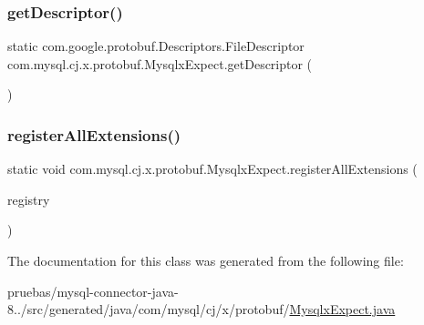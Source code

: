 \subsubsection{\texorpdfstring{get\+Descriptor()}{getDescriptor()}}
{\footnotesize\ttfamily static com.\+google.\+protobuf.\+Descriptors.\+File\+Descriptor com.\+mysql.\+cj.\+x.\+protobuf.\+Mysqlx\+Expect.\+get\+Descriptor (\begin{DoxyParamCaption}{ }\end{DoxyParamCaption})\hspace{0.3cm}{\ttfamily [static]}}

\mbox{\label{classcom_1_1mysql_1_1cj_1_1x_1_1protobuf_1_1_mysqlx_expect_ad11f0acd1644efca1f4e418da0d17e3c}} 
\subsubsection{\texorpdfstring{register\+All\+Extensions()}{registerAllExtensions()}}
{\footnotesize\ttfamily static void com.\+mysql.\+cj.\+x.\+protobuf.\+Mysqlx\+Expect.\+register\+All\+Extensions (\begin{DoxyParamCaption}\item[{com.\+google.\+protobuf.\+Extension\+Registry}]{registry }\end{DoxyParamCaption})\hspace{0.3cm}{\ttfamily [static]}}



The documentation for this class was generated from the following file\+:\begin{DoxyCompactItemize}
\item 
pruebas/mysql-\/connector-\/java-\/8../src/generated/java/com/mysql/cj/x/protobuf/\mbox{\hyperlink{_mysqlx_expect_8java}{Mysqlx\+Expect.\+java}}\end{DoxyCompactItemize}
